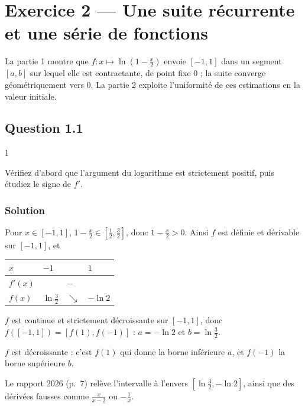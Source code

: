\documentclass[11pt,a4paper]{article}
\newcommand{\equationajustee}[1]{%
  \sbox{\boiteequation}{$\displaystyle #1$}%
  \ifdim\wd\boiteequation>\linewidth
    \[\resizebox{\linewidth}{!}{\usebox{\boiteequation}}\]%
  \else
    \[#1\]%
  \fi}
\begin{document}
\hypertarget{exercice-2-une-suite-ruxe9currente-et-une-suxe9rie-de-fonctions}{%
\section{Exercice 2 --- Une suite récurrente et une série de fonctions}\label{exercice-2-une-suite-ruxe9currente-et-une-suxe9rie-de-fonctions}}

La partie 1 montre que \(f:x\mapsto\ln(1-\frac x2)\) envoie \([-1,1]\) dans un segment \([a,b]\) sur lequel elle est contractante, de point fixe \(0\) ; la suite converge géométriquement vers \(0\). La partie 2 exploite l'uniformité de ces estimations en la valeur initiale.

\hypertarget{question-1.1}{%
\subsection{Question 1.1}\label{question-1.1}}

\begin{indication}{1}

Vérifiez d'abord que l'argument du logarithme est strictement positif, puis étudiez le signe de \(f'\).

\end{indication}

\hypertarget{solution-13}{%
\subsubsection{Solution}\label{solution-13}}

Pour \(x\in[-1,1]\), \(1-\frac x2\in[\frac12,\frac32]\), donc \(1-\frac x2>0\). Ainsi \(f\) est définie et dérivable sur \([-1,1]\), et

\equationajustee{f'(x)=\frac{-1/2}{1-x/2}=-\frac1{2-x}<0.}

\begin{longtable}[]{@{}llll@{}}
\toprule\noalign{}
\(x\) & \(-1\) & & \(1\) \\
\midrule\noalign{}
\endhead
\bottomrule\noalign{}
\endlastfoot
\(f'(x)\) & & \(-\) & \\
\(f(x)\) & \(\ln\frac32\) & \(\searrow\) & \(-\ln2\) \\
\end{longtable}

\(f\) est continue et strictement décroissante sur \([-1,1]\), donc \(f([-1,1])=[f(1),f(-1)]\) : \(a=-\ln2\) et \(b=\ln\frac32\).

\begin{piege}

\(f\) est décroissante : c'est \(f(1)\) qui donne la borne inférieure \(a\), et \(f(-1)\) la borne supérieure \(b\).

Le rapport 2026 (p.~7) relève l'intervalle à l'envers \([\ln\frac32,-\ln2]\), ainsi que des dérivées fausses comme \(\frac{x}{x-2}\) ou \(-\frac1x\).

\end{piege}
\end{document}
